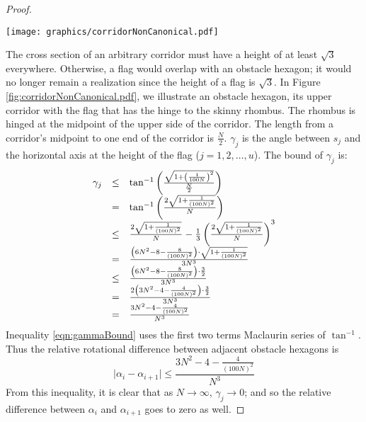 \begin{proof}
\begin{minipage}{\linewidth}
\begin{center}
\texttt{[image: graphics/corridorNonCanonical.pdf]}
\label{fig:corridorNonCanonical.pdf}
\end{center}
\end{minipage}

The cross section of an arbitrary corridor must have a height of at least $\sqrt{3}$ everywhere. 
Otherwise, a flag would overlap with an obstacle hexagon; it would no longer remain a realization since the height of a flag is $\sqrt{3}$.
In Figure \ref{fig:corridorNonCanonical.pdf}, we illustrate an obstacle hexagon, its upper corridor with the flag that has the hinge to the skinny rhombus.  
The rhombus is hinged at the midpoint of the upper side of the corridor.
The length from a corridor's midpoint to one end of the corridor is $\frac{N}{2}$.
$\gamma_j$ is the angle between $s_j$ and the horizontal axis at the height of the flag ($j = 1,2,\ldots, u$).
The bound of $\gamma_j$ is:
\begin{equation}\label{eqn:gammaBound}
\begin{array}{rcl}
\gamma_j &\leq & \tan^{-1} \left( 
								\frac{
										\sqrt{1+ \left( 	\frac{1}{100N}	 \right)^2}
								}{
										\frac{N}{2}
								}	
							 \right)\\
&=& \tan^{-1} \left( \frac{2\sqrt{1 + \frac{1}{(100N)^2}}}{N} \right)\\
&\leq& \frac{2\sqrt{1 + \frac{1}{(100N)^2}}}{N} - \frac{1}{3}\left( \frac{2\sqrt{1 + \frac{1}{(100N)^2}}}{N} \right)^3\\
&=&\frac{\left( 6N^2 - 8 - \frac{8}{(100N)^2} \right)\cdot \sqrt{1 + \frac{1}{(100N)^2}} }{3N^3}\\
&\leq&\frac{\left( 6N^2 - 8 - \frac{8}{(100N)^2} \right)\cdot \frac{3}{2} }{3N^3}\\
&=&\frac{2\left( 3N^2 - 4 - \frac{4}{(100N)^2} \right)\cdot \frac{3}{2} }{3N^3}\\
&=&\frac{3N^2 - 4 - \frac{4}{(100N)^2}}{N^3}
\end{array} 
\end{equation}
Inequality \ref{eqn:gammaBound} uses the first two terms Maclaurin series of $\tan^{-1}$.
Thus the relative rotational difference between adjacent obstacle hexagons is
$$ \vert \alpha_i - \alpha_{i+1} \vert \leq \frac{3N^2 - 4 - \frac{4}{(100N)^2}}{N^3}$$
From this inequality, it is clear that as $N \rightarrow \infty$, $\gamma_j \rightarrow 0$; and so the relative difference between $\alpha_i$ and $\alpha_{i+1}$ goes to zero as well.


\end{proof}
